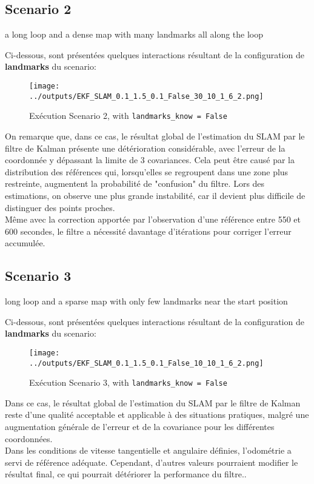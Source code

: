 \documentclass[../CSC_5RO12_TA_TP4.tex]{subfiles}
\begin{document}
\subsection{Scenario 2}
\begin{definition}
    a long loop and a dense map with many landmarks all along the loop
\end{definition}
\noindent Ci-dessous, sont présentées quelques interactions résultant de la configuration de \textbf{landmarks} du scenario:
\begin{figure}[H]
    \centering
	\texttt{[image: ../outputs/EKF\_SLAM\_0.1\_1.5\_0.1\_False\_30\_10\_1\_6\_2.png]}
	\caption{Exécution Scenario 2, with \texttt{landmarks\_know = False}}
	\label{}
\end{figure}
\noindent On remarque que, dans ce cas, le résultat global de l'estimation du SLAM par le filtre de Kalman présente une détérioration considérable, avec l'erreur de la coordonnée y dépassant la limite de 3 covariances. Cela peut être causé par la distribution des références qui, lorsqu'elles se regroupent dans une zone plus restreinte, augmentent la probabilité de "confusion" du filtre. Lors des estimations, on observe une plus grande instabilité, car il devient plus difficile de distinguer des points proches.\\

\noindent Même avec la correction apportée par l'observation d'une référence entre 550 et 600 secondes, le filtre a nécessité davantage d'itérations pour corriger l'erreur accumulée. 

\subsection{Scenario 3}
\begin{definition}
    long loop and a sparse map with only few landmarks near the start position
\end{definition}
\noindent Ci-dessous, sont présentées quelques interactions résultant de la configuration de \textbf{landmarks} du scenario:
\begin{figure}[H]
    \centering
	\texttt{[image: ../outputs/EKF\_SLAM\_0.1\_1.5\_0.1\_False\_10\_10\_1\_6\_2.png]}
	\caption{Exécution Scenario 3, with \texttt{landmarks\_know = False}}
	\label{}
\end{figure}
\noindent Dans ce cas, le résultat global de l'estimation du SLAM par le filtre de Kalman reste d'une qualité acceptable et applicable à des situations pratiques, malgré une augmentation générale de l'erreur et de la covariance pour les différentes coordonnées.\\

\noindent Dans les conditions de vitesse tangentielle et angulaire définies, l'odométrie a servi de référence adéquate. Cependant, d'autres valeurs pourraient modifier le résultat final, ce qui pourrait détériorer la performance du filtre..
\end{document}
